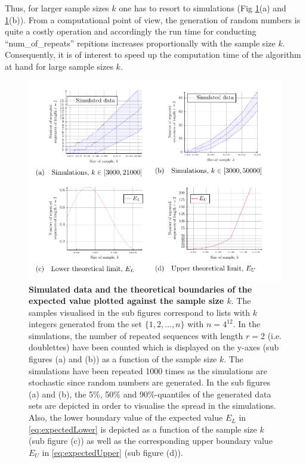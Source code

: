 \documentclass{article}
\begin{document}
Thus, for larger sample sizes $k$ one has to resort to simulations (Fig \ref{fig:simulations}(a) and \ref{fig:simulations}(b)). From a computational point of view, the generation of random numbers is quite a costly operation and accordingly the run time for conducting ``num\_of\_repeats'' repitions increases proportionally with the sample size $k$. Consequently, it is of interest to speed up the computation time of the algorithm at hand for large sample sizes $k$. 
\begin{figure}[htbp!]
  \begin{center}
\includegraphics[width=\textwidth]{../Figures/Fig1/Fig1.pdf}
\caption[\textbf{Simulated data and the theoretical boundaries of the expected value plotted against the sample size $k$}]{\textbf{Simulated data and the theoretical boundaries of the expected value plotted against the sample size $k$}. The samples visualised in the sub figures correspond to lists with $k$ integers generated from the set $\{1,2,\ldots,n\}$ with $n=4^{12}$. In the simulations, the number of repeated sequences with length $r=2$ (i.e. doublettes) have been counted which is displayed on the y-axes (sub figures (a) and (b)) as a function of the sample size $k$. The simulations have been repeated 1000 times as the simulations are stochastic since random numbers are generated. In the sub figures (a) and (b), the 5\%, 50\% and 90\%-quantiles of the generated data sets are depicted in order to visualise the spread in the simulations. Also, the lower boundary value of the expected value $E_L$ in \eqref{eq:expectedLower} is depicted as a function of the sample size $k$ (sub figure (c)) as well as the corresponding upper boundary value $E_U$ in \eqref{eq:expectedUpper} (sub figure (d)).}
\label{fig:simulations}
  \end{center}
  \end{figure}
\end{document}
